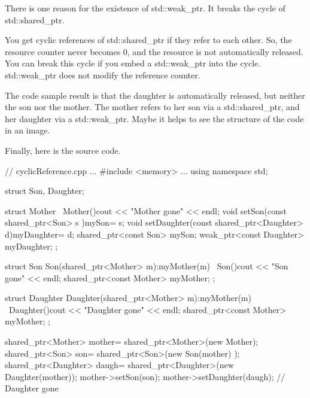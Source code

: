 There is one reason for the existence of std::weak\_ptr. It breaks the cycle of std::shared\_ptr.


You get cyclic references of std::shared\_ptr if they refer to each other. So, the resource counter never becomes 0, and the resource is not automatically released. You can break this cycle if you embed a std::weak\_ptr into the cycle. std::weak\_ptr does not modify the reference counter.

The code sample result is that the daughter is automatically released, but neither the son nor the mother. The mother refers to her son via a std::shared\_ptr, and her daughter via a std::weak\_ptr. Maybe it helps to see the structure of the code in an image.


Finally, here is the source code.


\begin{cpp}
// cyclicReference.cpp
...
#include <memory>
...
using namespace std;

struct Son, Daughter;

struct Mother{
	~Mother(){cout << "Mother gone" << endl;}
	void setSon(const shared_ptr<Son> s ){mySon= s;}
	void setDaughter(const shared_ptr<Daughter> d){myDaughter= d;}
	shared_ptr<const Son> mySon;
	weak_ptr<const Daughter> myDaughter;
};

struct Son{
	Son(shared_ptr<Mother> m):myMother(m){}
	~Son(){cout << "Son gone" << endl;}
	shared_ptr<const Mother> myMother;
};

struct Daughter{
	Daughter(shared_ptr<Mother> m):myMother(m){}
	~Daughter(){cout << "Daughter gone" << endl;}
	shared_ptr<const Mother> myMother;
};

{
	shared_ptr<Mother> mother= shared_ptr<Mother>(new Mother);
	shared_ptr<Son> son= shared_ptr<Son>(new Son(mother) );
	shared_ptr<Daughter> daugh= shared_ptr<Daughter>(new Daughter(mother));
	mother->setSon(son);
	mother->setDaughter(daugh);
}
// Daughter gone
\end{cpp}


